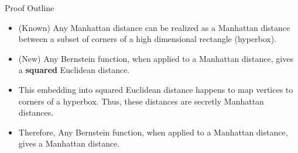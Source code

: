 \begin{frame}{Proof Outline}
  \begin{itemize}[<+->]
  \item (Known) Any Manhattan distance can be realized as a Manhattan
  distance between a subset of corners of a high dimensional rectangle (hyperbox).
  \item (New) Any Bernstein function, when applied to a Manhattan
  distance, gives a \textbf{squared} Euclidean distance.
  \item This embedding into squared Euclidean distance happens to map
  vertices to corners of a hyperbox. Thus, these distances are secretly
  Manhattan distances.
  \item Therefore, Any Bernstein function, when applied to a Manhattan
  distance, gives a Manhattan distance.
  \end{itemize}
\end{frame}
